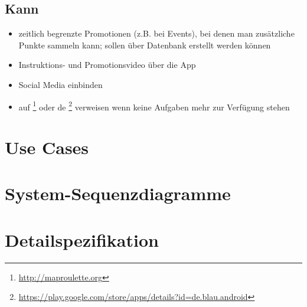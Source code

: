 \subsection{Kann}
\begin{itemize}
	\item zeitlich begrenzte Promotionen (z.B. bei Events), bei denen man zusätzliche Punkte sammeln kann; sollen über Datenbank erstellt werden können
	\item Instruktions- und Promotionsvideo über die App
	\item Social Media einbinden
	\item auf \footnote{\url{http://maproulette.org}} oder de \footnote{\url{https://play.google.com/store/apps/details?id=de.blau.android}} verweisen wenn keine Aufgaben mehr zur Verfügung stehen
\end{itemize}


\section{Use Cases}


\section{System-Sequenzdiagramme}


\section{Detailspezifikation}

